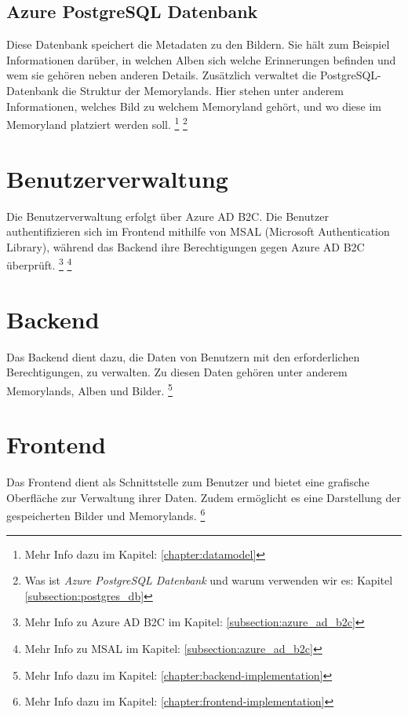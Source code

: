 \subsection{Azure PostgreSQL Datenbank}

Diese Datenbank speichert die Metadaten zu den Bildern. 
Sie hält zum Beispiel Informationen darüber, in welchen Alben sich welche Erinnerungen befinden
und wem sie gehören neben anderen Details. Zusätzlich verwaltet die PostgreSQL-Datenbank die 
Struktur der Memorylands. Hier stehen unter anderem Informationen, welches Bild zu welchem 
Memoryland gehört, und wo diese im Memoryland platziert werden soll.
\footnote{Mehr Info dazu im Kapitel: \ref{chapter:datamodel}}
\footnote{Was ist \emph{Azure PostgreSQL Datenbank} und warum verwenden wir es: Kapitel \ref{subsection:postgres_db}}

\section{Benutzerverwaltung}

Die Benutzerverwaltung erfolgt über Azure AD B2C. Die Benutzer authentifizieren sich 
im Frontend mithilfe von MSAL (Microsoft Authentication Library), während das Backend 
ihre Berechtigungen gegen Azure AD B2C überprüft.
\footnote{Mehr Info zu Azure AD B2C im Kapitel: \ref{subsection:azure_ad_b2c}}
\footnote{Mehr Info zu MSAL im Kapitel: \ref{subsection:azure_ad_b2c}}

\section{Backend}

Das Backend dient dazu, die Daten von Benutzern mit den erforderlichen Berechtigungen, 
zu verwalten. Zu diesen Daten gehören unter anderem Memorylands, Alben und Bilder.
\footnote{Mehr Info dazu im Kapitel: \ref{chapter:backend-implementation}}

\section{Frontend}

Das Frontend dient als Schnittstelle zum Benutzer und bietet eine grafische 
Oberfläche zur Verwaltung ihrer Daten. Zudem ermöglicht es eine Darstellung 
der gespeicherten Bilder und Memorylands.
\footnote{Mehr Info dazu im Kapitel: \ref{chapter:frontend-implementation}}


